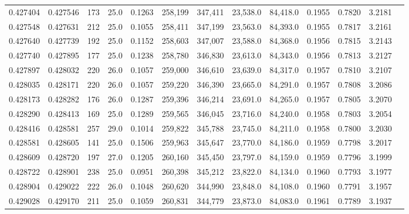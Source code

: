 \begin{tabular}{rrrrrrrrrrrrr}
0.427404 & 0.427546 &   173 & 25.0 &                                     0.1263 & 258,199 & 347,411 &  23,538.0 &  84,418.0 & 0.1955 & 0.7820 & 3.2181 \\
0.427548 & 0.427631 &   212 & 25.0 &                                     0.1055 & 258,411 & 347,199 &  23,563.0 &  84,393.0 & 0.1955 & 0.7817 & 3.2161 \\
0.427640 & 0.427739 &   192 & 25.0 &                                     0.1152 & 258,603 & 347,007 &  23,588.0 &  84,368.0 & 0.1956 & 0.7815 & 3.2143 \\
0.427740 & 0.427895 &   177 & 25.0 &                                     0.1238 & 258,780 & 346,830 &  23,613.0 &  84,343.0 & 0.1956 & 0.7813 & 3.2127 \\
0.427897 & 0.428032 &   220 & 26.0 &                                     0.1057 & 259,000 & 346,610 &  23,639.0 &  84,317.0 & 0.1957 & 0.7810 & 3.2107 \\
0.428035 & 0.428171 &   220 & 26.0 &                                     0.1057 & 259,220 & 346,390 &  23,665.0 &  84,291.0 & 0.1957 & 0.7808 & 3.2086 \\
0.428173 & 0.428282 &   176 & 26.0 &                                     0.1287 & 259,396 & 346,214 &  23,691.0 &  84,265.0 & 0.1957 & 0.7805 & 3.2070 \\
0.428290 & 0.428413 &   169 & 25.0 &                                     0.1289 & 259,565 & 346,045 &  23,716.0 &  84,240.0 & 0.1958 & 0.7803 & 3.2054 \\
0.428416 & 0.428581 &   257 & 29.0 &                                     0.1014 & 259,822 & 345,788 &  23,745.0 &  84,211.0 & 0.1958 & 0.7800 & 3.2030 \\
0.428581 & 0.428605 &   141 & 25.0 &                                     0.1506 & 259,963 & 345,647 &  23,770.0 &  84,186.0 & 0.1959 & 0.7798 & 3.2017 \\
0.428609 & 0.428720 &   197 & 27.0 &                                     0.1205 & 260,160 & 345,450 &  23,797.0 &  84,159.0 & 0.1959 & 0.7796 & 3.1999 \\
0.428722 & 0.428901 &   238 & 25.0 &                                     0.0951 & 260,398 & 345,212 &  23,822.0 &  84,134.0 & 0.1960 & 0.7793 & 3.1977 \\
0.428904 & 0.429022 &   222 & 26.0 &                                     0.1048 & 260,620 & 344,990 &  23,848.0 &  84,108.0 & 0.1960 & 0.7791 & 3.1957 \\
0.429028 & 0.429170 &   211 & 25.0 &                                     0.1059 & 260,831 & 344,779 &  23,873.0 &  84,083.0 & 0.1961 & 0.7789 & 3.1937 \\

\end{tabular}
